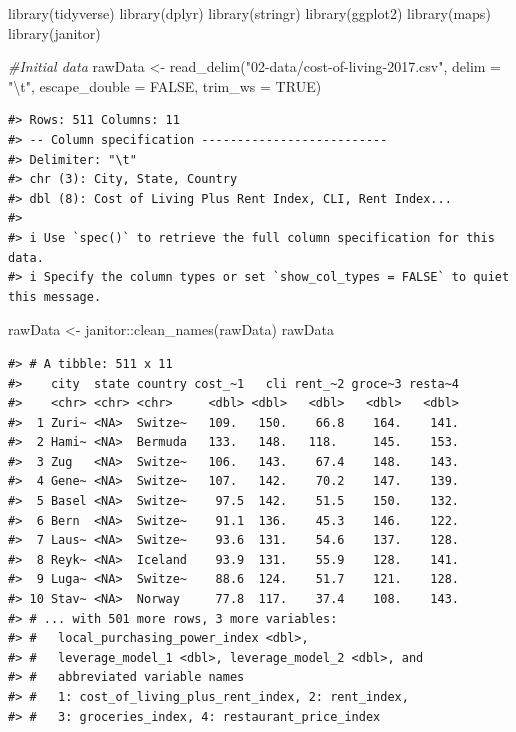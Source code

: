 \documentclass[
  11pt,
  a4paper,
  twoside]{scrbook}
\newenvironment{Shaded}{\begin{snugshade}}{\end{snugshade}}
\newcommand{\AttributeTok}[1]{\textcolor[rgb]{0.77,0.63,0.00}{#1}}
\newcommand{\CommentTok}[1]{\textcolor[rgb]{0.56,0.35,0.01}{\textit{#1}}}
\newcommand{\ConstantTok}[1]{\textcolor[rgb]{0.00,0.00,0.00}{#1}}
\newcommand{\FunctionTok}[1]{\textcolor[rgb]{0.00,0.00,0.00}{#1}}
\newcommand{\NormalTok}[1]{#1}
\newcommand{\OtherTok}[1]{\textcolor[rgb]{0.56,0.35,0.01}{#1}}
\newcommand{\SpecialCharTok}[1]{\textcolor[rgb]{0.00,0.00,0.00}{#1}}
\newcommand{\StringTok}[1]{\textcolor[rgb]{0.31,0.60,0.02}{#1}}
\begin{document}
\begin{Shaded}
\begin{Highlighting}[]
\FunctionTok{library}\NormalTok{(tidyverse)}
\FunctionTok{library}\NormalTok{(dplyr)}
\FunctionTok{library}\NormalTok{(stringr)}
\FunctionTok{library}\NormalTok{(ggplot2)}
\FunctionTok{library}\NormalTok{(maps)}
\FunctionTok{library}\NormalTok{(janitor)}

\CommentTok{\#Initial data}
\NormalTok{rawData }\OtherTok{\textless{}{-}} \FunctionTok{read\_delim}\NormalTok{(}\StringTok{"02{-}data/cost{-}of{-}living{-}2017.csv"}\NormalTok{, }
                                  \AttributeTok{delim =} \StringTok{"}\SpecialCharTok{\textbackslash{}t}\StringTok{"}\NormalTok{, }\AttributeTok{escape\_double =} \ConstantTok{FALSE}\NormalTok{, }
                                  \AttributeTok{trim\_ws =} \ConstantTok{TRUE}\NormalTok{)}
\end{Highlighting}
\end{Shaded}

\linespread{1}

\begin{verbatim}
#> Rows: 511 Columns: 11
#> -- Column specification --------------------------
#> Delimiter: "\t"
#> chr (3): City, State, Country
#> dbl (8): Cost of Living Plus Rent Index, CLI, Rent Index...
#> 
#> i Use `spec()` to retrieve the full column specification for this data.
#> i Specify the column types or set `show_col_types = FALSE` to quiet this message.
\end{verbatim}

\linespread{1}

\begin{Shaded}
\begin{Highlighting}[]
\NormalTok{rawData }\OtherTok{\textless{}{-}}\NormalTok{ janitor}\SpecialCharTok{::}\FunctionTok{clean\_names}\NormalTok{(rawData)}
\NormalTok{rawData}
\end{Highlighting}
\end{Shaded}

\linespread{1}

\begin{verbatim}
#> # A tibble: 511 x 11
#>    city  state country cost_~1   cli rent_~2 groce~3 resta~4
#>    <chr> <chr> <chr>     <dbl> <dbl>   <dbl>   <dbl>   <dbl>
#>  1 Zuri~ <NA>  Switze~   109.   150.    66.8    164.    141.
#>  2 Hami~ <NA>  Bermuda   133.   148.   118.     145.    153.
#>  3 Zug   <NA>  Switze~   106.   143.    67.4    148.    143.
#>  4 Gene~ <NA>  Switze~   107.   142.    70.2    147.    139.
#>  5 Basel <NA>  Switze~    97.5  142.    51.5    150.    132.
#>  6 Bern  <NA>  Switze~    91.1  136.    45.3    146.    122.
#>  7 Laus~ <NA>  Switze~    93.6  131.    54.6    137.    128.
#>  8 Reyk~ <NA>  Iceland    93.9  131.    55.9    128.    141.
#>  9 Luga~ <NA>  Switze~    88.6  124.    51.7    121.    128.
#> 10 Stav~ <NA>  Norway     77.8  117.    37.4    108.    143.
#> # ... with 501 more rows, 3 more variables:
#> #   local_purchasing_power_index <dbl>,
#> #   leverage_model_1 <dbl>, leverage_model_2 <dbl>, and
#> #   abbreviated variable names
#> #   1: cost_of_living_plus_rent_index, 2: rent_index,
#> #   3: groceries_index, 4: restaurant_price_index
\end{verbatim}
\end{document}
